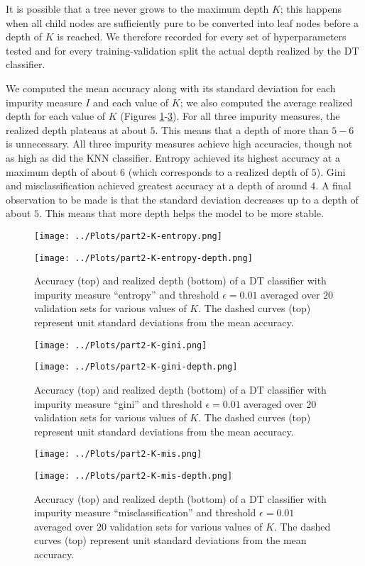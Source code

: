\documentclass[12pt]{article}
\newcommand{\eps}{\epsilon}
\begin{document}
It is possible that a tree never grows to the maximum depth $K$; this happens when all child nodes are sufficiently pure to be converted into leaf nodes before a depth of $K$ is reached. We therefore recorded for every set of hyperparameters tested and for every training-validation split the actual depth realized by the DT classifier.

We computed the mean accuracy along with its standard deviation for each impurity measure $I$ and each value of $K$; we also computed the average realized depth for each value of $K$ (Figures \ref{part2-K-entropy}-\ref{part2-K-mis}). For all three impurity measures, the realized depth plateaus at about $5$. This means that a depth of more than $5-6$ is unnecessary. All three impurity measures achieve high accuracies, though not as high as did the KNN classifier. Entropy achieved its highest accuracy at a maximum depth of about $6$ (which corresponds to a realized depth of $5$). Gini and misclassification achieved greatest accuracy at a depth of around $4$. A final observation to be made is that the standard deviation decreases up to a depth of about $5$. This means that more depth helps the model to be more stable.

\begin{figure}
\centering
\texttt{[image: ../Plots/part2-K-entropy.png]}

\texttt{[image: ../Plots/part2-K-entropy-depth.png]}
\caption{\label{part2-K-entropy} Accuracy (top) and realized depth (bottom) of a DT classifier with impurity measure ``entropy'' and threshold $\eps=0.01$ averaged over $20$ validation sets for various values of $K$. The dashed curves (top) represent unit standard deviations from the mean accuracy.}
\end{figure}

\begin{figure}
\centering
\texttt{[image: ../Plots/part2-K-gini.png]}

\texttt{[image: ../Plots/part2-K-gini-depth.png]}
\caption{\label{part2-K-gini} Accuracy (top) and realized depth (bottom) of a DT classifier with impurity measure ``gini'' and threshold $\eps=0.01$ averaged over $20$ validation sets for various values of $K$. The dashed curves (top) represent unit standard deviations from the mean accuracy.}
\end{figure}

\begin{figure}
\centering
\texttt{[image: ../Plots/part2-K-mis.png]}

\texttt{[image: ../Plots/part2-K-mis-depth.png]}
\caption{\label{part2-K-mis} Accuracy (top) and realized depth (bottom) of a DT classifier with impurity measure ``misclassification'' and threshold $\eps=0.01$ averaged over $20$ validation sets for various values of $K$. The dashed curves (top) represent unit standard deviations from the mean accuracy.}
\end{figure}
\end{document}
